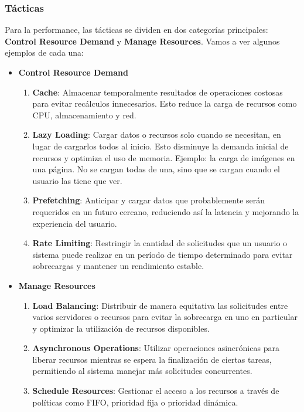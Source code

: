 \documentclass{article}
\begin{document}
		\subsubsection{Tácticas}
		Para la performance, las tácticas se dividen en dos categorías principales: \textbf{Control Resource Demand} y \textbf{Manage Resources}. Vamos a ver algunos ejemplos de cada una:
		
		\begin{itemize}		
			\item \textbf{Control Resource Demand}
			\begin{enumerate}
				\item \textbf{Cache}: Almacenar temporalmente resultados de operaciones costosas para evitar recálculos innecesarios. Esto reduce la carga de recursos como CPU, almacenamiento y red.
				
				\item \textbf{Lazy Loading}: Cargar datos o recursos solo cuando se necesitan, en lugar de cargarlos todos al inicio. Esto disminuye la demanda inicial de recursos y optimiza el uso de memoria. Ejemplo: la carga de imágenes en una página. No se cargan todas de una, sino que se cargan cuando el usuario las tiene que ver.
				
				\item \textbf{Prefetching}: Anticipar y cargar datos que probablemente serán requeridos en un futuro cercano, reduciendo así la latencia y mejorando la experiencia del usuario.
				
				
				\item \textbf{Rate Limiting}: Restringir la cantidad de solicitudes que un usuario o sistema puede realizar en un período de tiempo determinado para evitar sobrecargas y mantener un rendimiento estable.
				
				
			\end{enumerate}
			
			\item \textbf{Manage Resources}
			\begin{enumerate}
				\item \textbf{Load Balancing}: Distribuir de manera equitativa las solicitudes entre varios servidores o recursos para evitar la sobrecarga en uno en particular y optimizar la utilización de recursos disponibles.
				
				\item \textbf{Asynchronous Operations}: Utilizar operaciones asincrónicas para liberar recursos mientras se espera la finalización de ciertas tareas, permitiendo al sistema manejar más solicitudes concurrentes.
				
				\item \textbf{Schedule Resources}: Gestionar el acceso a los recursos a través de políticas como FIFO, prioridad fija o prioridad dinámica.
				
				
			\end{enumerate}	
			
		\end{itemize}
		
\end{document}
